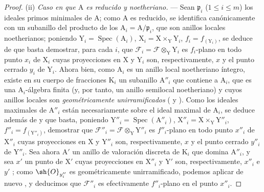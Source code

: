 \begin{proof}
(ii) \emph{Caso en que $\mathrm{A}$ es reducido y noetheriano.} --- Sean $\mathfrak{p}_i$ ($1\leq i\leq m$) los ideales primos minimales de $\mathrm{A}$; como $\mathrm{A}$ es reducido, se identifica canónicamente con un subanillo del producto de los $\mathrm{A}_i=\mathrm{A}/\mathfrak{p}_i$, que son anillos locales noetherianos; poniendo $\mathrm{Y}_i=\operatorname{Spec}(\mathrm{A}_i)$, $\mathrm{X}_i=\mathrm{X}\times_\mathrm{Y}\mathrm{Y}_i$, $f_i=f_{(\mathrm{Y}_i)}$, se deduce de  que basta demostrar, para cada $i$, que $\mathscr{F}_i=\mathscr{F}\otimes_\mathrm{Y}\mathrm{Y}_i$ es $f_i$-plano en todo punto $x_i$ de $\mathrm{X}_i$ cuyas proyecciones en $\mathrm{X}$ y $\mathrm{Y}_i$ son, respectivamente, $x$ y el punto cerrado $y_i$ de $\mathrm{Y}_i$.
Ahora bien, como $\mathrm{A}_i$ es un anillo local noetheriano íntegro, existe en su cuerpo de fracciones $\mathrm{K}_i$ un subanillo $\mathrm{A}''_i$ que contiene a $\mathrm{A}_i$, que es una $\mathrm{A}_i$-álgebra finita (y, por tanto, un anillo semilocal noetheriano) y cuyos anillos locales son \emph{geométricamente unirramificados} ( y ).
Como los ideales maximales de $\mathrm{A}''_i$ están necesariamente sobre el ideal maximal de $\mathrm{A}_i$, se deduce además de  y  que basta, poniendo $\mathrm{Y}''_i=\operatorname{Spec}(\mathrm{A}''_i)$, $\mathrm{X}''_i=\mathrm{X}\times_\mathrm{Y}\mathrm{Y}''_i$, $f''_i=f_{(\mathrm{Y}''_i)}$, demostrar que $\mathscr{F}''_i=\mathscr{F}\otimes_\mathrm{Y}\mathrm{Y}''_i$ es $f''_i$-plano en todo punto $x''_i$ de $\mathrm{X}''_i$ cuyas proyecciones en $\mathrm{X}$ y $\mathrm{Y}''_i$ son, respectivamente, $x$ y el punto cerrado $y''_i$ de $\mathrm{Y}''_i$.
Sea ahora $\mathrm{A}'$ un anillo de valoración discreta de $\mathrm{K}_i$ que domina $\mathrm{A}''_i$, y sea $x'$ un punto de $\mathrm{X}'$ cuyas proyecciones en $\mathrm{X}''_i$ y $\mathrm{Y}'$ son, respectivamente, $x''_i$ e $y'$ ; como $\sh{O}_{y''_i}$ es geométricamente unirramificado, podemos aplicar de nuevo , y deducimos que $\mathscr{F}''_i$ es efectivamente $f''_i$-plano en el punto $x''_i$.
\end{proof}

